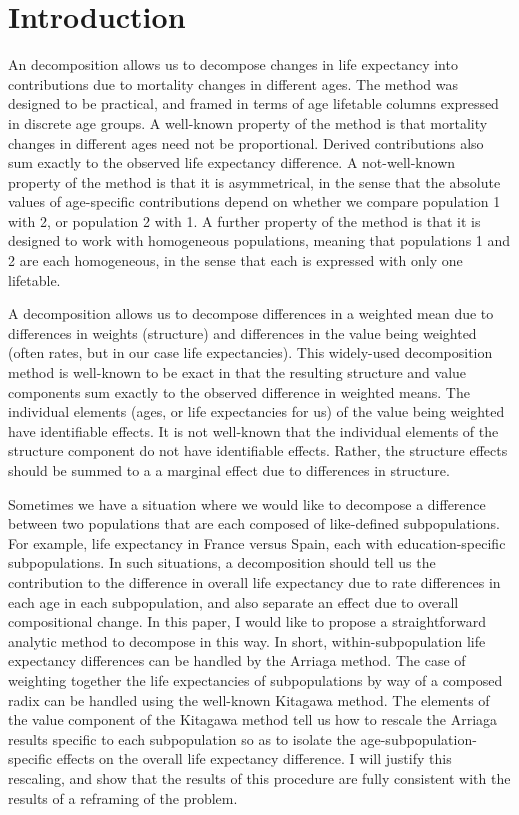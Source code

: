 \documentclass[sn-apa,pdflatex]{sn-jnl}
\theoremstyle{remark}
\theoremstyle{definition}
\begin{document}
\hypertarget{introduction}{%
\section{Introduction}\label{introduction}}

An \citet{arriaga1984measuring} decomposition allows us to decompose
changes in life expectancy into contributions due to mortality changes
in different ages. The method was designed to be practical, and framed
in terms of age lifetable columns expressed in discrete age groups. A
well-known property of the method is that mortality changes in different
ages need not be proportional. Derived contributions also sum exactly to
the observed life expectancy difference. A not-well-known property of
the method is that it is asymmetrical, in the sense that the absolute
values of age-specific contributions depend on whether we compare
population 1 with 2, or population 2 with 1. A further property of the
method is that it is designed to work with homogeneous populations,
meaning that populations 1 and 2 are each homogeneous, in the sense that
each is expressed with only one lifetable.

A \citet{kitagawa1955components} decomposition allows us to decompose
differences in a weighted mean due to differences in weights (structure)
and differences in the value being weighted (often rates, but in our
case life expectancies). This widely-used decomposition method is
well-known to be exact in that the resulting structure and value
components sum exactly to the observed difference in weighted means. The
individual elements (ages, or life expectancies for us) of the value
being weighted have identifiable effects. It is not well-known that the
individual elements of the structure component do not have identifiable
effects. Rather, the structure effects should be summed to a a marginal
effect due to differences in structure.

Sometimes we have a situation where we would like to decompose a
difference between two populations that are each composed of
like-defined subpopulations. For example, life expectancy in France
versus Spain, each with education-specific subpopulations. In such
situations, a decomposition should tell us the contribution to the
difference in overall life expectancy due to rate differences in each
age in each subpopulation, and also separate an effect due to overall
compositional change. In this paper, I would like to propose a
straightforward analytic method to decompose in this way. In short,
within-subpopulation life expectancy differences can be handled by the
Arriaga method. The case of weighting together the life expectancies of
subpopulations by way of a composed radix can be handled using the
well-known Kitagawa method. The elements of the value component of the
Kitagawa method tell us how to rescale the Arriaga results specific to
each subpopulation so as to isolate the age-subpopulation-specific
effects on the overall life expectancy difference. I will justify this
rescaling, and show that the results of this procedure are fully
consistent with the results of a \citet{horiuchi2008decomposition}
reframing of the problem.
\end{document}
